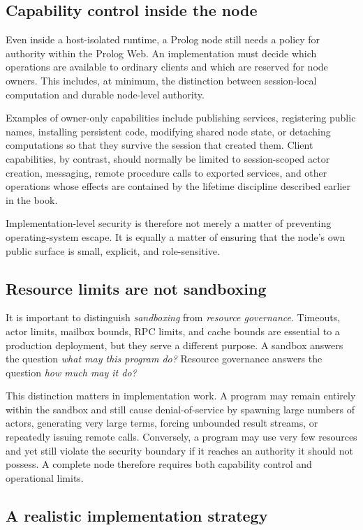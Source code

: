 \subsection{Capability control inside the node}

Even inside a host-isolated runtime, a Prolog node still needs a policy for authority within the Prolog Web. An implementation must decide which operations are available to ordinary clients and which are reserved for node owners. This includes, at minimum, the distinction between session-local computation and durable node-level authority.

Examples of owner-only capabilities include publishing services, registering public names, installing persistent code, modifying shared node state, or detaching computations so that they survive the session that created them. Client capabilities, by contrast, should normally be limited to session-scoped actor creation, messaging, remote procedure calls to exported services, and other operations whose effects are contained by the lifetime discipline described earlier in the book.

Implementation-level security is therefore not merely a matter of preventing operating-system escape. It is equally a matter of ensuring that the node's own public surface is small, explicit, and role-sensitive.

\subsection{Resource limits are not sandboxing}

It is important to distinguish \emph{sandboxing} from \emph{resource governance}. Timeouts, actor limits, mailbox bounds, RPC limits, and cache bounds are essential to a production deployment, but they serve a different purpose. A sandbox answers the question \emph{what may this program do?} Resource governance answers the question \emph{how much may it do?}

This distinction matters in implementation work. A program may remain entirely within the sandbox and still cause denial-of-service by spawning large numbers of actors, generating very large terms, forcing unbounded result streams, or repeatedly issuing remote calls. Conversely, a program may use very few resources and yet still violate the security boundary if it reaches an authority it should not possess. A complete node therefore requires both capability control and operational limits.

\subsection{A realistic implementation strategy}

